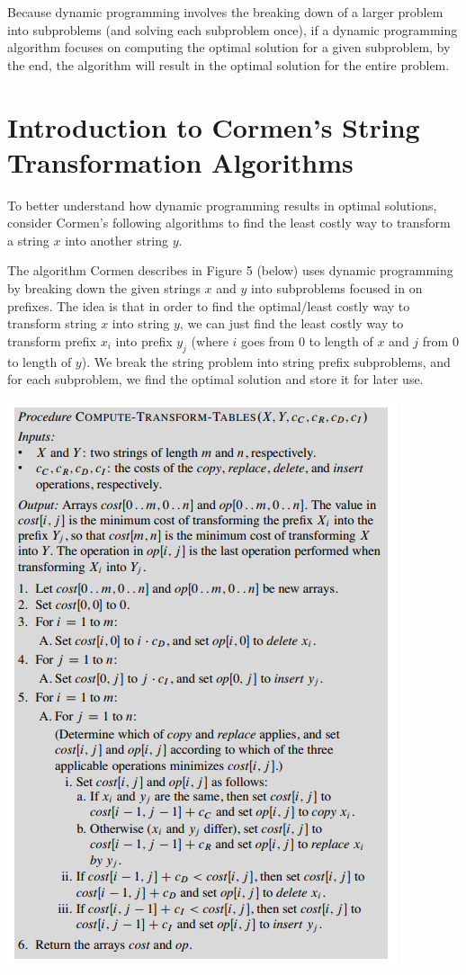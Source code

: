 \documentclass[12pt,letterpaper]{article}
\begin{document}
Because dynamic programming involves the breaking down of a larger problem into subproblems (and solving each subproblem once), if a dynamic programming algorithm focuses on computing the optimal solution for a given subproblem, by the end, the algorithm will result in the optimal solution for the entire problem.

\section{Introduction to Cormen’s String Transformation Algorithms}
To better understand how dynamic programming results in optimal solutions, consider Cormen’s following algorithms to find the least costly way to transform a string $x$ into another string $y$.

The algorithm Cormen describes in Figure 5 (below) uses dynamic programming by breaking down the given strings $x$ and $y$ into subproblems focused in on prefixes. The idea is that in order to find the optimal/least costly way to transform string $x$ into string $y$, we can just find the least costly way to transform prefix $x_i$ into prefix $y_j$ (where $i$ goes from 0 to length of $x$ and $j$ from 0 to length of $y$). We break the string problem into string prefix subproblems, and for each subproblem, we find the optimal solution and store it for later use. 

\includegraphics[scale=0.8]{images/cormenalgo1.png}
\end{document}
